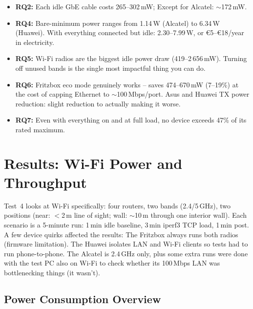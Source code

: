 \begin{itemize}
    \item \textbf{RQ2:} Each idle \ac{GbE} cable costs 265--302\,mW; Except for Alcatel: $\sim$172\,mW.
    \item \textbf{RQ4:} Bare-minimum power ranges from 1.14\,W (Alcatel) to 6.34\,W (Huawei). With everything connected but idle: 2.30--7.99\,W, or \euro{5}--\euro{18}/year in electricity.
    \item \textbf{RQ5:} Wi-Fi radios are the biggest idle power draw (419--2\,656\,mW). Turning off unused bands is the single most impactful thing you can do.
    \item \textbf{RQ6:} Fritzbox eco mode genuinely works -- saves 474--670\,mW (7--19\%) at the cost of capping Ethernet to $\sim$100\,Mbps/port. Asus and Huawei TX power reduction: slight reduction to actually making it worse.
    \item \textbf{RQ7:} Even with everything on and at full load, no device exceeds 47\% of its rated maximum.
\end{itemize}

\section{Results: Wi-Fi Power and Throughput}
\label{sec:results-wifi}

Test~4 looks at Wi-Fi specifically: four routers, two bands (2.4/5\,GHz), two positions (near: $<$2\,m line of sight; wall: $\sim$10\,m through one interior wall).
Each scenario is a 5-minute run: 1\,min idle baseline, 3\,min iperf3 \ac{TCP} load, 1\,min post.
A few device quirks affected the results: The Fritzbox always runs both radios (firmware limitation). The Huawei isolates \ac{LAN} and Wi-Fi clients so tests had to run phone-to-phone. The Alcatel is 2.4\,GHz only, plus some extra runs were done with the test PC also on Wi-Fi to check whether its 100\,Mbps \ac{LAN} was bottlenecking things (it wasn't).

\subsection{Power Consumption Overview}
\label{sec:results-wifi-power}

